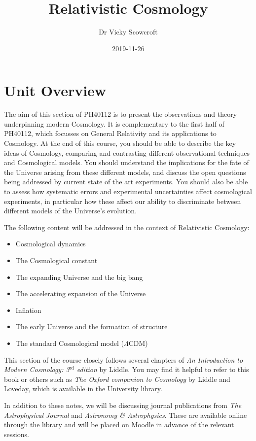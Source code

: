 \documentclass[]{book}
\title{Relativistic Cosmology}
\author{Dr Vicky Scowcroft}
\date{2019-11-26}
\begin{document}
\maketitle

{
\setcounter{tocdepth}{1}
\tableofcontents
}
\chapter{Unit Overview}\label{unit-overview}

The aim of this section of PH40112 is to present the observations and
theory underpinning modern Cosmology. It is complementary to the first
half of PH40112, which focusses on General Relativity and its
applications to Cosmology. At the end of this course, you should be able
to describe the key ideas of Cosmology, comparing and contrasting
different observational techniques and Cosmological models. You should
understand the implications for the fate of the Universe arising from
these different models, and discuss the open questions being addressed
by current state of the art experiments. You should also be able to
assess how systematic errors and experimental uncertainties affect
cosmological experiments, in particular how these affect our ability to
discriminate between different models of the Universe's evolution.

The following content will be addressed in the context of Relativistic
Cosmology:

\begin{itemize}
\item
  Cosmological dynamics
\item
  The Cosmological constant
\item
  The expanding Universe and the big bang
\item
  The accelerating expansion of the Universe
\item
  Inflation
\item
  The early Universe and the formation of structure
\item
  The standard Cosmological model (\(\Lambda\)CDM)
\end{itemize}

This section of the course closely follows several chapters of \emph{An
Introduction to Modern Cosmology: 3\(^{\text{rd}}\) edition} by Liddle.
You may find it helpful to refer to this book or others such as
\emph{The Oxford companion to Cosmology} by Liddle and Loveday, which is
available in the University library.

In addition to these notes, we will be discussing journal publications
from \emph{The Astrophysical Journal} and \emph{Astronomy \&
Astrophysics}. These are available online through the library and will
be placed on Moodle in advance of the relevant sessions.
\end{document}
